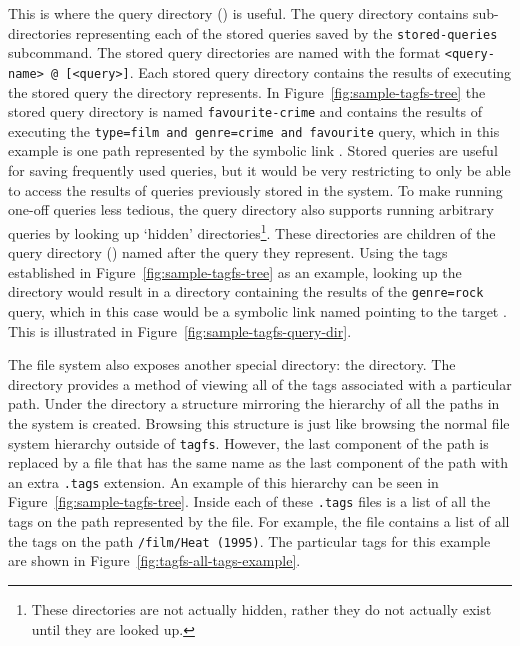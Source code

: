 This is where the query directory () is useful. The query directory
contains sub-directories representing each of the stored queries saved by the
\texttt{stored-queries} subcommand. The stored query directories are named with
the format \texttt{<query-name> @ [<query>]}. Each stored query directory
contains the results of executing the stored query the directory represents. In
Figure~\ref{fig:sample-tagfs-tree} the stored query directory is named
\texttt{favourite-crime} and contains the results of executing the
\texttt{type=film and genre=crime and favourite} query, which in this example
is one path represented by the symbolic link . Stored
queries are useful for saving frequently used queries, but it would be very
restricting to only be able to access the results of queries previously stored
in the system. To make running one-off queries less tedious, the query
directory also supports running arbitrary queries by looking up
`hidden' directories\footnote{These directories are not actually hidden, rather
they do not actually exist until they are looked up.}. These directories are
children of the query directory () named after the query they
represent. Using the tags established in Figure~\ref{fig:sample-tagfs-tree} as
an example, looking up the directory  would result in a
directory containing the results of the \texttt{genre=rock} query, which in
this case would be a symbolic link named  pointing
to the target . This is illustrated in Figure~\ref{fig:sample-tagfs-query-dir}.

The file system also exposes another special directory: the 
directory. The  directory provides a method of viewing all of the
tags associated with a particular path. Under the  directory a
structure mirroring the hierarchy of all the paths in the system is created.
Browsing this structure is just like browsing the normal file system hierarchy
outside of \texttt{tagfs}. However, the last component of the path is replaced
by a file that has the same name as the last component of the path with an
extra \texttt{.tags} extension. An example of this hierarchy can be seen in
Figure~\ref{fig:sample-tagfs-tree}. Inside each of these \texttt{.tags} files
is a list of all the tags on the path represented by the file. For example,
the file  contains a list of
all the tags on the path \texttt{/film/Heat (1995)}. The particular tags for
this example are shown in Figure~\ref{fig:tagfs-all-tags-example}.

